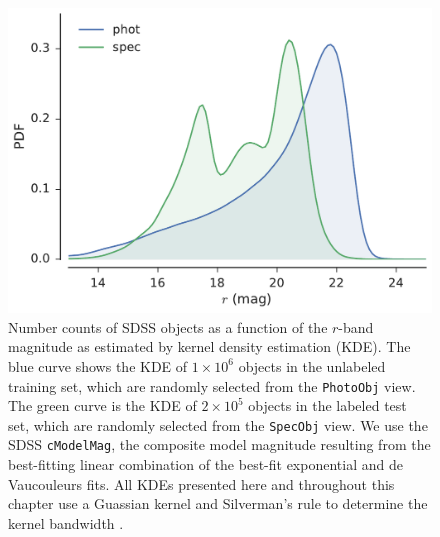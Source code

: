 \begin{figure}
  \centering
  \includegraphics[width=\columnwidth]{figures/spec_phot.pdf}
  \caption{
    Number counts of SDSS objects as a function of the $r$-band magnitude as estimated by kernel density estimation (KDE).
    The blue curve shows the KDE of $1 \times 10^6$ objects in the unlabeled training set,
    which are randomly selected from the \texttt{PhotoObj} view.
    The green curve is the KDE of $2 \times 10^5$ objects in the labeled test set,
    which are randomly selected from the \texttt{SpecObj} view.
    We use the SDSS \texttt{cModelMag}, the composite model magnitude resulting from the best-fitting linear combination
    of the best-fit exponential and de Vaucouleurs fits.
    All KDEs presented here and throughout this chapter use a Guassian kernel and Silverman's rule to determine
    the kernel bandwidth \citep{silverman1986density}.
  }
  \label{fig:spec_phot}
\end{figure}


